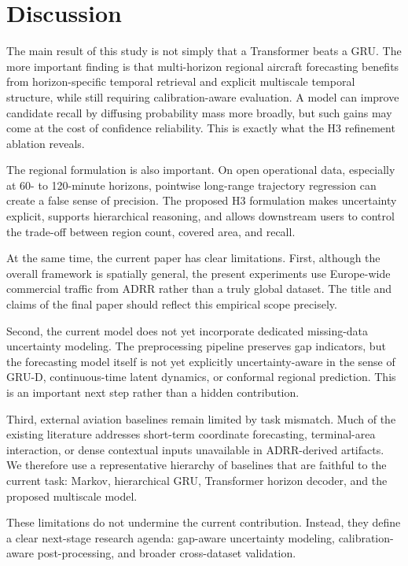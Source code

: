 \section{Discussion}

The main result of this study is not simply that a Transformer beats a GRU. The more important finding is that multi-horizon regional aircraft forecasting benefits from horizon-specific temporal retrieval and explicit multiscale temporal structure, while still requiring calibration-aware evaluation. A model can improve candidate recall by diffusing probability mass more broadly, but such gains may come at the cost of confidence reliability. This is exactly what the H3 refinement ablation reveals.

The regional formulation is also important. On open operational data, especially at 60- to 120-minute horizons, pointwise long-range trajectory regression can create a false sense of precision. The proposed H3 formulation makes uncertainty explicit, supports hierarchical reasoning, and allows downstream users to control the trade-off between region count, covered area, and recall.

At the same time, the current paper has clear limitations. First, although the overall framework is spatially general, the present experiments use Europe-wide commercial traffic from ADRR rather than a truly global dataset. The title and claims of the final paper should reflect this empirical scope precisely.

Second, the current model does not yet incorporate dedicated missing-data uncertainty modeling. The preprocessing pipeline preserves gap indicators, but the forecasting model itself is not yet explicitly uncertainty-aware in the sense of GRU-D, continuous-time latent dynamics, or conformal regional prediction. This is an important next step rather than a hidden contribution.

Third, external aviation baselines remain limited by task mismatch. Much of the existing literature addresses short-term coordinate forecasting, terminal-area interaction, or dense contextual inputs unavailable in ADRR-derived artifacts. We therefore use a representative hierarchy of baselines that are faithful to the current task: Markov, hierarchical GRU, Transformer horizon decoder, and the proposed multiscale model.

These limitations do not undermine the current contribution. Instead, they define a clear next-stage research agenda: gap-aware uncertainty modeling, calibration-aware post-processing, and broader cross-dataset validation.
